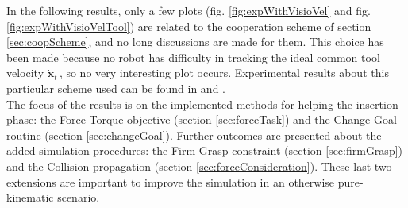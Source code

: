 In the following results, only a few plots (fig. \ref{fig:expWithVisioVel} and fig. \ref{fig:expWithVisioVelTool}) are related to the cooperation scheme of section \ref{sec:coopScheme}, and no long discussions are made for them. This choice has been made because no robot has difficulty in tracking the ideal common tool velocity $\dot{\boldsymbol{x}}_t\,$, so no very interesting plot occurs. Experimental results about this particular scheme used can be found in \cite{IntroMaris2} and \cite{tesiWander}.\\

The focus of the results is on the implemented methods for helping the insertion phase: the Force-Torque objective (section \ref{sec:forceTask}) and the Change Goal routine (section \ref{sec:changeGoal}). Further outcomes are presented about the added simulation procedures: the Firm Grasp constraint (section \ref{sec:firmGrasp}) and the Collision propagation (section \ref{sec:forceConsideration}). These last two extensions are important to improve the simulation in an otherwise pure-kinematic scenario.

